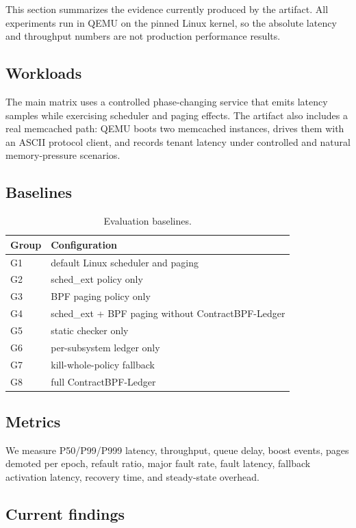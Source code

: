 \documentclass[letterpaper,twocolumn,10pt]{article}
\newcommand{\sys}{ContractBPF-Ledger\xspace}
\begin{document}
This section summarizes the evidence currently produced by the artifact. All
experiments run in QEMU on the pinned Linux kernel, so the absolute latency and
throughput numbers are not production performance results.

\subsection{Workloads}

The main matrix uses a controlled phase-changing service that emits latency
samples while exercising scheduler and paging effects. The artifact also
includes a real memcached path: QEMU boots two memcached instances, drives them
with an ASCII protocol client, and records tenant latency under controlled and
natural memory-pressure scenarios.

\subsection{Baselines}

\begin{table}[t]
\centering
\caption{Evaluation baselines.}
\begin{tabular}{ll}
\toprule
Group & Configuration \\
\midrule
G1 & default Linux scheduler and paging \\
G2 & sched\_ext policy only \\
G3 & BPF paging policy only \\
G4 & sched\_ext + BPF paging without \sys \\
G5 & static checker only \\
G6 & per-subsystem ledger only \\
G7 & kill-whole-policy fallback \\
G8 & full \sys \\
\bottomrule
\end{tabular}
\end{table}

\subsection{Metrics}

We measure P50/P99/P999 latency, throughput, queue delay, boost events, pages demoted per epoch, refault ratio, major fault rate, fault latency, fallback activation latency, recovery time, and steady-state overhead.

\subsection{Current findings}
\end{document}
